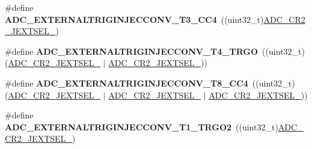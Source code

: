 \begin{DoxyCompactItemize}
\item 
\mbox{\label{group___a_d_c_ex___external__trigger___source___injected_ga826c3989c8fe4861729fdb966ff07c2d}} 
\#define {\bfseries A\+D\+C\+\_\+\+E\+X\+T\+E\+R\+N\+A\+L\+T\+R\+I\+G\+I\+N\+J\+E\+C\+C\+O\+N\+V\+\_\+\+T3\+\_\+\+C\+C4}~((uint32\+\_\+t)\mbox{\hyperlink{group___peripheral___registers___bits___definition_ga571bb97f950181fedbc0d4756482713d}{A\+D\+C\+\_\+\+C\+R2\+\_\+\+J\+E\+X\+T\+S\+E\+L\+\_}})
\item 
\mbox{\label{group___a_d_c_ex___external__trigger___source___injected_ga87a5534698643b2c3872efb7d17d4f44}} 
\#define {\bfseries A\+D\+C\+\_\+\+E\+X\+T\+E\+R\+N\+A\+L\+T\+R\+I\+G\+I\+N\+J\+E\+C\+C\+O\+N\+V\+\_\+\+T4\+\_\+\+T\+R\+GO}~((uint32\+\_\+t)(\mbox{\hyperlink{group___peripheral___registers___bits___definition_ga571bb97f950181fedbc0d4756482713d}{A\+D\+C\+\_\+\+C\+R2\+\_\+\+J\+E\+X\+T\+S\+E\+L\+\_}} $\vert$ \mbox{\hyperlink{group___peripheral___registers___bits___definition_gaa70c1f30e2101e2177ce564440203ba3}{A\+D\+C\+\_\+\+C\+R2\+\_\+\+J\+E\+X\+T\+S\+E\+L\+\_}}))
\item 
\mbox{\label{group___a_d_c_ex___external__trigger___source___injected_ga762d1f0453208046c4c93dbd392c0e2e}} 
\#define {\bfseries A\+D\+C\+\_\+\+E\+X\+T\+E\+R\+N\+A\+L\+T\+R\+I\+G\+I\+N\+J\+E\+C\+C\+O\+N\+V\+\_\+\+T8\+\_\+\+C\+C4}~((uint32\+\_\+t)(\mbox{\hyperlink{group___peripheral___registers___bits___definition_ga571bb97f950181fedbc0d4756482713d}{A\+D\+C\+\_\+\+C\+R2\+\_\+\+J\+E\+X\+T\+S\+E\+L\+\_}} $\vert$ \mbox{\hyperlink{group___peripheral___registers___bits___definition_ga99fa4a240d34ce231d6d0543bac7fd9b}{A\+D\+C\+\_\+\+C\+R2\+\_\+\+J\+E\+X\+T\+S\+E\+L\+\_}} $\vert$ \mbox{\hyperlink{group___peripheral___registers___bits___definition_gaa70c1f30e2101e2177ce564440203ba3}{A\+D\+C\+\_\+\+C\+R2\+\_\+\+J\+E\+X\+T\+S\+E\+L\+\_}}))
\item 
\mbox{\label{group___a_d_c_ex___external__trigger___source___injected_gaef9c43a36999a02dfe34d2fbfeb4f7e2}} 
\#define {\bfseries A\+D\+C\+\_\+\+E\+X\+T\+E\+R\+N\+A\+L\+T\+R\+I\+G\+I\+N\+J\+E\+C\+C\+O\+N\+V\+\_\+\+T1\+\_\+\+T\+R\+G\+O2}~((uint32\+\_\+t)\mbox{\hyperlink{group___peripheral___registers___bits___definition_gae34f5dda7a153ffd927c9cd38999f822}{A\+D\+C\+\_\+\+C\+R2\+\_\+\+J\+E\+X\+T\+S\+E\+L\+\_}})

\end{DoxyCompactItemize}
